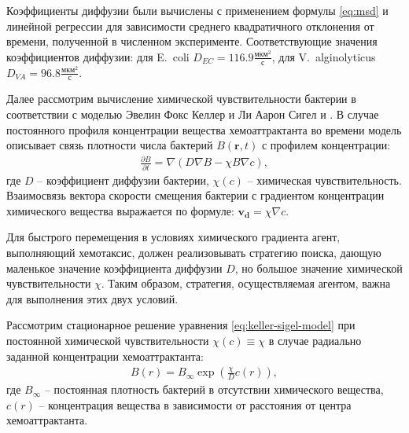 
Коэффициенты диффузии были вычислены с применением формулы \cref{eq:msd} и линейной регрессии для зависимости среднего квадратичного отклонения от времени, полученной в численном эксперименте. Соответствующие значения коэффициентов диффузии: для E.~coli $D_{EC}=116.9 \frac{\textrm{мкм}^2}{\textrm{с}}$, для V.~alginolyticus $D_{VA}=96.8 \frac{\textrm{мкм}^2}{\textrm{с}}$.

Далее рассмотрим вычисление химической чувствительности бактерии в соответствии с моделью Эвелин Фокс Келлер и Ли Аарон Сигел и \cite{keller_model_1971}. В случае постоянного профиля концентрации вещества хемоаттрактанта во времени модель описывает связь плотности числа бактерий $B(\textbf{r}, t)$ с профилем концентрации:
\begin{equation}
    \begin{aligned}
        \frac{\partial B}{\partial t}=\nabla (D \nabla B - \chi B \nabla c),
    \label{eq:keller-sigel-model}
    \end{aligned}
\end{equation}
где $D$ -- коэффициент диффузии бактерии, $\chi (c)$ -- химическая чувствительность. Взаимосвязь вектора скорости смещения бактерии с градиентом концентрации химического вещества выражается по формуле: $\boldsymbol{v_d}=\chi \nabla c$. 

Для быстрого перемещения в условиях химического градиента агент, выполняющий хемотаксис, должен реализовывать стратегию поиска, дающую маленькое значение коэффициента диффузии $D$, но большое значение химической чувствительности $\chi$. Таким образом, стратегия, осуществляемая агентом, важна для выполнения этих двух условий.

Рассмотрим стационарное решение уравнения \cref{eq:keller-sigel-model} при постоянной химической чувствительности $\chi(c) \equiv \chi$ в случае радиально заданной концентрации хемоаттрактанта:
\begin{equation}
    \begin{aligned}
        B(r) = B_{\infty} \exp \left ( \frac{\chi}{D}c(r) \right ),
    \label{eq:keller-sigel-stationary-solution}
    \end{aligned}
\end{equation}
где $B_{\infty}$ -- постоянная плотность бактерий в отсутствии химического вещества, $c(r)$ -- концентрация вещества в зависимости от расстояния от центра хемоаттрактанта.

